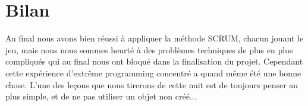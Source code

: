 \documentclass[a4paper,francais,titlepage]{article}
\begin{document}
\pagebreak   
\section{Bilan}
  Au final nous avons bien réussi à appliquer la méthode SCRUM, chacun jouant le jeu, mais nous nous sommes heurté à des problèmes techniques de plus en plus compliqués qui au final nous ont bloqué dans la finalisation du projet. Cependant cette expérience d'extrême programming concentré a quand même été une bonne chose. L'une des leçons que nous tirerons de cette nuit est de toujours penser au plus simple, et de ne pas utiliser un objet non créé...
\end{document}

